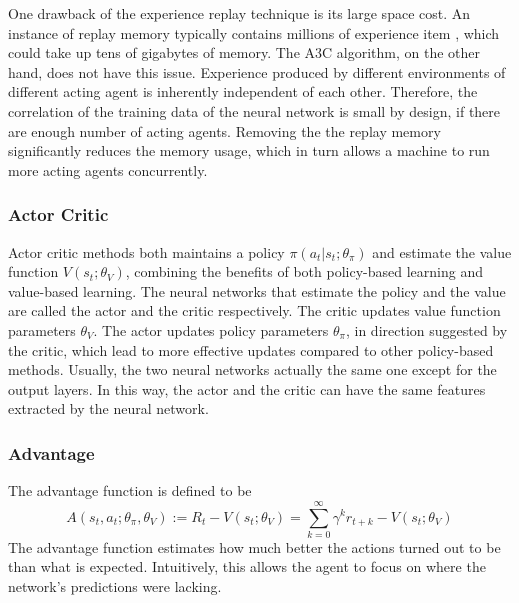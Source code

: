            One drawback of the experience replay technique is its large space cost.
            An instance of replay memory typically contains millions of experience item \cite{mnih_human-level_2015},
            which could take up tens of gigabytes of memory.
            The A3C algorithm, on the other hand, does not have this issue.
            Experience produced by different environments of different acting agent
            is inherently independent of each other.
            Therefore, the correlation of the training data of the neural network is small by design,
            if there are enough number of acting agents.
            Removing the the replay memory significantly reduces the memory usage,
            which in turn allows a machine to run more acting agents concurrently.

        \subsubsection{Actor Critic}

            Actor critic methods both maintains a policy $\pi(a_t|s_t;\theta_{\pi})$ and 
            estimate the value function $V(s_t;\theta_V)$,
            combining the benefits of both policy-based learning and value-based learning.
            The neural networks that estimate the policy and the value are called the actor and the critic respectively.
            The critic updates value function parameters $\theta_V$.
            The actor updates policy parameters $\theta_{\pi}$, in direction suggested by the critic,
            which lead to more effective updates compared to other policy-based methods.
            Usually, the two neural networks actually the same one except for the output layers.
            In this way, the actor and the critic can have the same features extracted by the neural network.

        \subsubsection{Advantage}

            The advantage function is defined to be
            \[
            A(s_t,a_t;\theta_{\pi},\theta_V) := R_t - V(s_t;\theta_V)
            = \sum_{k=0}^{\infty} \gamma^k r_{t+k} - V(s_t;\theta_V)
            \]
            The advantage function estimates how much better the actions turned out to be than what is expected.
            Intuitively, this allows the agent to focus on where the network's predictions were lacking.



















